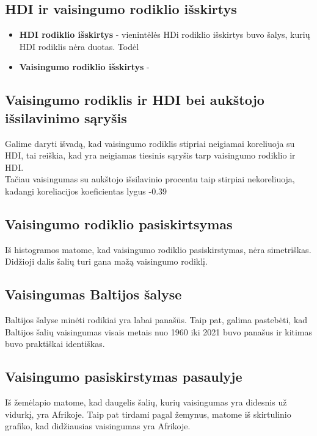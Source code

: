 \subsection{HDI ir vaisingumo rodiklio išskirtys}
\begin{itemize}
    \item \textbf{HDI rodiklio išskirtys} - vienintėlės HDi rodiklio išskirtys buvo šalys, kurių HDI rodiklis nėra duotas. Todėl  
    \item \textbf{Vaisingumo rodiklio išskirtys} - 
\end{itemize}

\subsection{Vaisingumo rodiklis ir HDI bei aukštojo išsilavinimo sąryšis}
Galime daryti išvadą, kad vaisingumo rodiklis stipriai neigiamai koreliuoja su HDI, tai reiškia, kad yra neigiamas tiesinis sąryšis tarp vaisingumo rodiklio ir HDI. \\
Tačiau vaisingumas su aukštojo išsilavinio procentu taip stirpiai nekoreliuoja, kadangi koreliacijos koeficientas lygus -0.39

\subsection{Vaisingumo rodiklio pasiskirtsymas}
Iš histogramos matome, kad vaisingumo rodiklio pasiskirstymas, nėra simetriškas. Didžioji dalis šalių turi gana mažą vaisingumo rodiklį. 

\subsection{Vaisingumas Baltijos šalyse}
Baltijos šalyse minėti rodikiai yra labai panašūs. Taip pat, galima pastebėti, kad Baltijos šalių vaisingumas visais metais nuo 1960 iki 2021 buvo panašus ir kitimas buvo praktiškai identiškas.

\subsection{Vaisingumo pasiskirstymas pasaulyje}
Iš žemėlapio matome, kad daugelis šalių, kurių vaisingumas yra didesnis už vidurkį, yra Afrikoje.
Taip pat tirdami pagal žemynus, matome iš skirtulinio grafiko, kad didžiausias vaisingumas yra Afrikoje.
